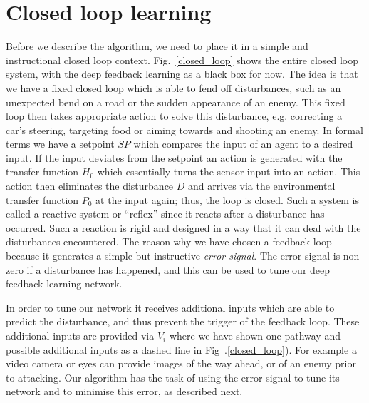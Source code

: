 \documentclass[Afour,sageh,times]{sagej}
\begin{document}
\section{Closed loop learning}
Before we describe the algorithm, we need to place it in a simple and
instructional closed loop context. Fig.~\ref{closed_loop} shows the
entire closed loop system, with the deep feedback learning as a black
box for now. The idea is that we have a fixed closed loop which is
able to fend off disturbances, such as an unexpected bend on a road or
the sudden appearance of an enemy. This fixed loop then takes
appropriate action to solve this disturbance, e.g. correcting a car's
steering, targeting food or aiming towards and shooting an enemy. In
formal terms we have a setpoint $SP$ which compares the input of an
agent to a desired input. If the input deviates from the setpoint an
action is generated with the transfer function $H_0$ which essentially
turns the sensor input into an action. This action then eliminates the
disturbance $D$ and arrives via the environmental transfer function
$P_0$ at the input again; thus, the loop is closed. Such a system is
called a reactive system or ``reflex'' since it reacts after a
disturbance has occurred. Such a reaction is rigid and designed in a
way that it can deal with the disturbances encountered.  The reason
why we have chosen a feedback loop because it generates a simple but
instructive \textsl{error signal}. The error signal is non-zero if a
disturbance has happened, and this can be used to tune our deep
feedback learning network.

In order to tune our network it receives additional inputs which are
able to predict the disturbance, and thus prevent the trigger of the
feedback loop. These additional inputs are provided via $V_i$ where we
have shown one pathway and possible additional inputs as a dashed line
in Fig~.\ref{closed_loop}). For example a video camera or eyes can
provide images of the way ahead, or of an enemy prior to
attacking. Our algorithm has the task of using the error signal to
tune its network and to minimise this error, as described next.
\end{document}
